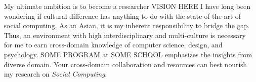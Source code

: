 %
\noindent
My ultimate ambition is to become a researcher VISION HERE
I have long been wondering if cultural difference has anything to do with the state of the art of social computing. 
As an Asian, it is my inherent responsibility to bridge the gap.
Thus, an environment with high interdisciplinary and multi-culture is necessary
for me to earn cross-domain knowledge of computer science, design, and psychology.
SOME PROGRAM at SOME SCHOOL emphasizes the insights from diverse domain. 
Your cross-domain collaboration and resources can best nourish my research on \textit{Social Computing}.\\



